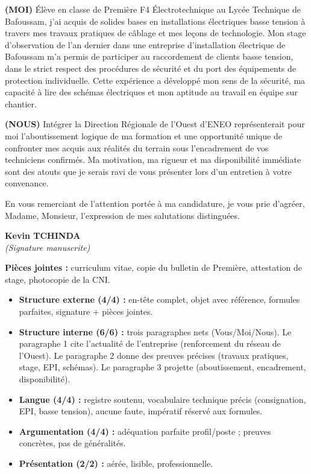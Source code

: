 \documentclass[11pt]{article}
\begin{document}
\begin{exoresolu}
\vspace{0.2cm}
\noindent \textbf{(MOI)} Élève en classe de Première F4 Électrotechnique au Lycée Technique de Bafoussam, j'ai acquis de solides bases en installations électriques basse tension à travers mes travaux pratiques de câblage et mes leçons de technologie. Mon stage d'observation de l'an dernier dans une entreprise d'installation électrique de Bafoussam m'a permis de participer au raccordement de clients basse tension, dans le strict respect des procédures de sécurité et du port des équipements de protection individuelle. Cette expérience a développé mon sens de la sécurité, ma capacité à lire des schémas électriques et mon aptitude au travail en équipe sur chantier.

\vspace{0.2cm}
\noindent \textbf{(NOUS)} Intégrer la Direction Régionale de l'Ouest d'ENEO représenterait pour moi l'aboutissement logique de ma formation et une opportunité unique de confronter mes acquis aux réalités du terrain sous l'encadrement de vos techniciens confirmés. Ma motivation, ma rigueur et ma disponibilité immédiate sont des atouts que je serais ravi de vous présenter lors d'un entretien à votre convenance.

\vspace{0.2cm}
\noindent En vous remerciant de l'attention portée à ma candidature, je vous prie d'agréer, Madame, Monsieur, l'expression de mes salutations distinguées.

\vspace{1cm}
\hfill \textbf{Kevin TCHINDA} \\
\hfill \textit{(Signature manuscrite)}

\vspace{0.2cm}
\noindent \textbf{Pièces jointes :} curriculum vitae, copie du bulletin de Première, attestation de stage, photocopie de la CNI.
\end{exoresolu}

\begin{aretenir}
\begin{itemize}
\item \textbf{Structure externe (4/4) :} en-tête complet, objet avec référence, formules parfaites, signature + pièces jointes.
\item \textbf{Structure interne (6/6) :} trois paragraphes nets (Vous/Moi/Nous). Le paragraphe 1 cite l'actualité de l'entreprise (renforcement du réseau de l'Ouest). Le paragraphe 2 donne des preuves précises (travaux pratiques, stage, EPI, schémas). Le paragraphe 3 projette (aboutissement, encadrement, disponibilité).
\item \textbf{Langue (4/4) :} registre soutenu, vocabulaire technique précis (consignation, EPI, basse tension), aucune faute, impératif réservé aux formules.
\item \textbf{Argumentation (4/4) :} adéquation parfaite profil/poste ; preuves concrètes, pas de généralités.
\item \textbf{Présentation (2/2) :} aérée, lisible, professionnelle.
\end{itemize}
\end{aretenir}
\end{document}
